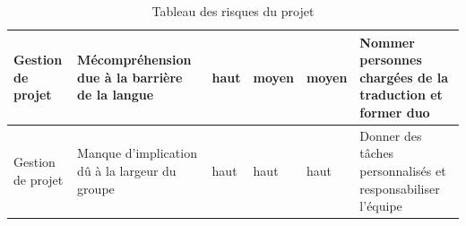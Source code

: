 \begin{table}[h!]
\begin{tabularx}{\textwidth}{|p{2cm}|p{3.2cm}|p{2.6cm}|p{2cm}|p{2cm}|p{3cm}|}
      \hline
      Gestion de projet  & Mécompréhension due à la barrière de la langue & haut                 & moyen            & moyen                     & Nommer personnes chargées de la traduction et former duo    \\
      \hline
      Gestion de projet  & Manque d'implication dû à la largeur du groupe & haut                 & haut             & haut                      & Donner des tâches personnalisés et responsabiliser l'équipe \\
      \hline
   \end{tabularx}
   \caption{Tableau des risques du projet}
\end{table}
